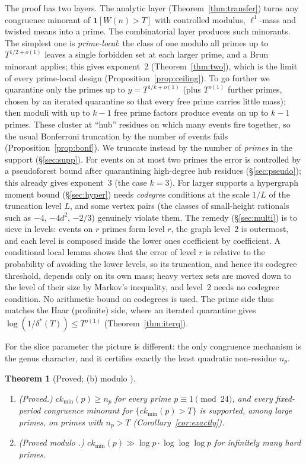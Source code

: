 \documentclass[11pt,reqno]{amsart}
\newtheorem{theorem}{Theorem}[section]
\theoremstyle{definition}
\newcommand{\ckmin}{ck_{\min}}
\begin{document}
The proof has two layers.  The analytic layer (Theorem~\ref{thm:transfer})
turns any congruence minorant of $\mathbf 1[W(n)>T]$ with controlled modulus,
$\ell^1$-mass and twisted means into a prime.  The combinatorial layer
produces such minorants.  The simplest one is \emph{prime-local}: the class of
one modulo all primes up to $T^{1/2+o(1)}$ leaves a single forbidden set at each
larger prime, and a Brun minorant applies; this gives exponent~$2$
(Theorem~\ref{thm:two}), which is the limit of every prime-local design
(Proposition~\ref{prop:ceiling}).  To go further we quarantine only the primes
up to $y=T^{1/k+o(1)}$ (plus $T^{o(1)}$ further primes, chosen by an iterated
quarantine so that every free prime carries little mass); then moduli with up
to $k-1$ free prime factors produce events on up to $k-1$ primes.  These
cluster at ``hub'' residues on which many events fire together, so the usual
Bonferroni truncation by the number of events fails
(Proposition~\ref{prop:bonf}).  We truncate instead by the number of
\emph{primes} in the support (\S\ref{sec:supp}).  For events on at most two
primes the error is controlled by a pseudoforest bound after quarantining
high-degree hub residues (\S\ref{sec:pseudo}); this already gives
exponent~$3$ (the case $k=3$).  For larger supports a hypergraph moment bound
(\S\ref{sec:hyper}) needs \emph{codegree} conditions at the scale
$1/L$ of the truncation level $L$, and some vertex pairs (the classes of
small-height rationals such as $-4$, $-4d^2$, $-2/3$) genuinely violate them.
The remedy (\S\ref{sec:multi}) is to sieve in levels: events on $r$ primes form
level $r$, the graph level~$2$ is outermost, and each level is composed inside
the lower ones coefficient by coefficient.  A conditional local lemma shows
that the error of level $r$ is relative to the probability of avoiding the
lower levels, so its truncation, and hence its codegree threshold, depends only
on its own mass; heavy vertex sets are moved down to the level of their size by
Markov's inequality, and level~$2$ needs no codegree condition.  No arithmetic
bound on codegrees is used.  The prime side thus matches the Haar (profinite)
side, where an iterated quarantine gives $\log(1/\delta^*(T))\le T^{o(1)}$
(Theorem~\ref{thm:iterq}).

For the slice parameter the picture is different: the only congruence
mechanism is the genus character, and it certifies exactly the least
quadratic non-residue $n_p$.

\begin{theorem}[Proved; (b) modulo {\cite[Prop.~5.1]{LW}}]\label{thm:slice-intro}\mbox{}
\begin{enumerate}
\item[(a)] \textup{(Proved.)} $\ckmin(p)\ge n_p$ for every prime
$p\equiv1\pmod{24}$, and every fixed-period congruence minorant for
$\{\ckmin(p)>T\}$ is supported, among large primes, on primes with $n_p>T$
\textup{(Corollary~\ref{cor:exactly})}.
\item[(b)] \textup{(Proved modulo \cite[Prop.~5.1]{LW}.)}
$\ckmin(p)\gg\log p\cdot\log\log\log p$ for infinitely many hard primes.
\end{enumerate}
\end{theorem}
\end{document}
